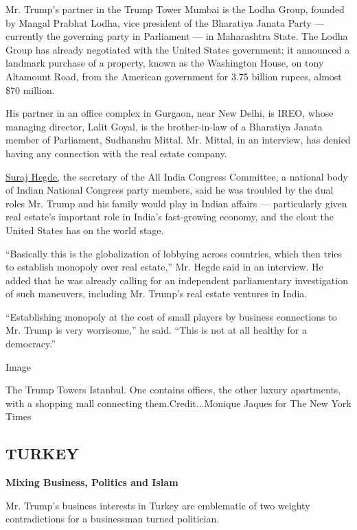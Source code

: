 Mr. Trump's partner in the Trump Tower Mumbai is the Lodha Group,
founded by Mangal Prabhat Lodha, vice president of the Bharatiya Janata
Party --- currently the governing party in Parliament --- in Maharashtra
State. The Lodha Group has already negotiated with the United States
government; it announced a landmark purchase of a property, known as the
Washington House, on tony Altamount Road, from the American government
for 3.75 billion rupees, almost \$70 million.

His partner in an office complex in Gurgaon, near New Delhi, is IREO,
whose managing director, Lalit Goyal, is the brother-in-law of a
Bharatiya Janata member of Parliament, Sudhanshu Mittal. Mr. Mittal, in
an interview, has denied having any connection with the real estate
company.

\href{https://www.facebook.com/pg/AICC-Secretary-SURAJ-HEGDE-687397901292152/about/}{Suraj
Hegde,} the secretary of the All India Congress Committee, a national
body of Indian National Congress party members, said he was troubled by
the dual roles Mr. Trump and his family would play in Indian affairs ---
particularly given real estate's important role in India's fast-growing
economy, and the clout the United States has on the world stage.

``Basically this is the globalization of lobbying across countries,
which then tries to establish monopoly over real estate,'' Mr. Hegde
said in an interview. He added that he was already calling for an
independent parliamentary investigation of such maneuvers, including Mr.
Trump's real estate ventures in India.

``Establishing monopoly at the cost of small players by business
connections to Mr. Trump is very worrisome,'' he said. ``This is not at
all healthy for a democracy.''

Image

The Trump Towers Istanbul. One contains offices, the other luxury
apartments, with a shopping mall connecting them.Credit...Monique Jaques
for The New York Times

\hypertarget{turkey}{%
\subsection{TURKEY}\label{turkey}}

\textbf{Mixing Business, Politics and Islam}

Mr. Trump's business interests in Turkey are emblematic of two weighty
contradictions for a businessman turned politician.

